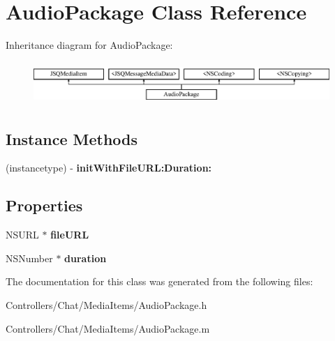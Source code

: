 \hypertarget{interface_audio_package}{}\section{Audio\+Package Class Reference}
\label{interface_audio_package}
Inheritance diagram for Audio\+Package\+:\begin{figure}[H]
\begin{center}
\leavevmode
\includegraphics[height=1.637427cm]{interface_audio_package}
\end{center}
\end{figure}
\subsection*{Instance Methods}
\begin{DoxyCompactItemize}
\item 
\hypertarget{interface_audio_package_ae23fcd5359388b6cdb381ec6585ba67e}{}(instancetype) -\/ {\bfseries init\+With\+File\+U\+R\+L\+:\+Duration\+:}\label{interface_audio_package_ae23fcd5359388b6cdb381ec6585ba67e}

\end{DoxyCompactItemize}
\subsection*{Properties}
\begin{DoxyCompactItemize}
\item 
\hypertarget{interface_audio_package_aed955e928928b6ebd57d9fea8ac4bdb3}{}N\+S\+U\+R\+L $\ast$ {\bfseries file\+U\+R\+L}\label{interface_audio_package_aed955e928928b6ebd57d9fea8ac4bdb3}

\item 
\hypertarget{interface_audio_package_a46c5648b1b1ae94251666dcb5cb22025}{}N\+S\+Number $\ast$ {\bfseries duration}\label{interface_audio_package_a46c5648b1b1ae94251666dcb5cb22025}

\end{DoxyCompactItemize}


The documentation for this class was generated from the following files\+:\begin{DoxyCompactItemize}
\item 
Controllers/\+Chat/\+Media\+Items/Audio\+Package.\+h\item 
Controllers/\+Chat/\+Media\+Items/Audio\+Package.\+m\end{DoxyCompactItemize}
